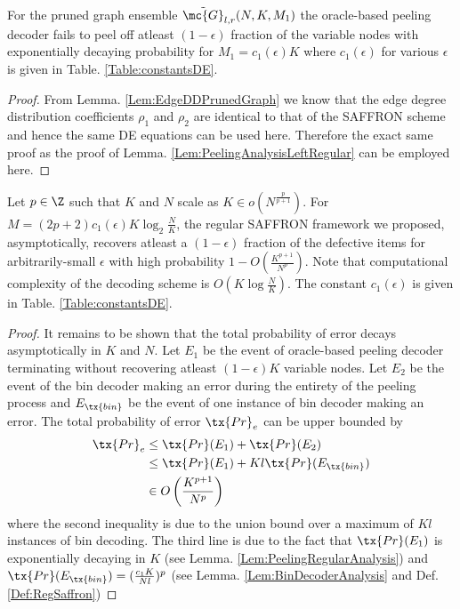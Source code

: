 \documentclass[conference,twocolumn]{IEEEtran}
\begin{document}
\begin{lemma}
\label{Lem:PeelingRegularAnalysis}
For the pruned graph ensemble $\tilde{\mc{G}}_{l,r}(N, K,M_1)$ the oracle-based peeling decoder fails to peel off atleast $(1-\epsilon)$ fraction of the variable nodes with exponentially decaying probability for $M_1=c_1(\epsilon)K$ where $c_1(\epsilon)$ for various $\epsilon$ is given in Table. \ref{Table:constantsDE}.
\end{lemma}


\begin{proof}
From Lemma. \ref{Lem:EdgeDDPrunedGraph} we know that the edge degree distribution coefficients $\rho_1$ and $\rho_2$ are identical to that of the SAFFRON scheme and hence the same DE equations can be used here. Therefore the exact same proof as the proof of Lemma. \ref{Lem:PeelingAnalysisLeftRegular} can be employed here.
\end{proof}

\begin{theorem}
\label{Thm:NoiselessMain}
Let $p\in\Z$ such that $K$ and $N$ scale as $K\in o(N^{\frac{p}{p+1}})$. For $M=(2p+2)c_1(\epsilon)K \log_{2}\frac{N}{K}$, the regular SAFFRON framework we proposed, asymptotically, recovers atleast a $(1-\epsilon)$ fraction of the defective items for arbitrarily-small $\epsilon$ with high probability $1-O\left(\frac{K^{p+1}}{N^p}\right)$. Note that computational complexity of the decoding scheme is $O(K\log \frac{N}{K})$. The constant $c_1(\epsilon)$ is given in Table. \ref{Table:constantsDE}.
\end{theorem}
\begin{proof}
It remains to be shown that the total probability of error decays asymptotically in $K$ and $N$. Let $E_1$ be the event of oracle-based peeling decoder terminating without recovering atleast $(1-\epsilon)K$ variable nodes. Let $E_2$ be the event of the bin decoder making an error during the entirety of the peeling process and $E_{\tx{bin}}$ be the event of one instance of bin decoder making an error. The total probability of error $\tx{Pr}_e$ can be upper bounded by 
\begin{align*}
\tx{Pr}_e &\leq \tx{Pr}(E_1)+ \tx{Pr}(E_2)\\
               &\leq \tx{Pr}(E_1)+ Kl\tx{Pr}(E_{\tx{bin}})\\
               &\in O\left(\frac{K^{p+1}}{N^p}\right)
\end{align*}
where the second inequality is due to the union bound over a maximum of $Kl$ instances of bin decoding. The third line is due to the fact that $\tx{Pr}(E_1)$ is exponentially decaying in $K$ (see Lemma. \ref{Lem:PeelingRegularAnalysis}) and $\tx{Pr}(E_{\tx{bin}})=(\frac{c_1K}{Nl})^p$ (see Lemma. \ref{Lem:BinDecoderAnalysis} and Def. \ref{Def:RegSaffron})
\end{proof}
\end{document}
